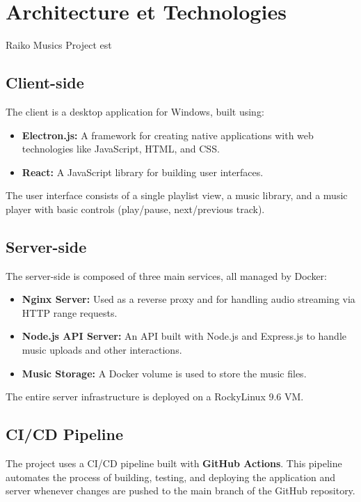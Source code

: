 \documentclass[12pt,a4paper]{article} %
\begin{document}
\section{Architecture et Technologies}

Raiko Musics Project est 

\subsection{Client-side}
The client is a desktop application for Windows, built using:
\begin{itemize}
    \item \textbf{Electron.js:} A framework for creating native applications with web technologies like JavaScript, HTML, and CSS.
    \item \textbf{React:} A JavaScript library for building user interfaces.
\end{itemize}

The user interface consists of a single playlist view, a music library, and a music player with basic controls (play/pause, next/previous track).

\subsection{Server-side}
The server-side is composed of three main services, all managed by Docker:
\begin{itemize}
    \item \textbf{Nginx Server:} Used as a reverse proxy and for handling audio streaming via HTTP range requests.
    \item \textbf{Node.js API Server:} An API built with Node.js and Express.js to handle music uploads and other interactions.
    \item \textbf{Music Storage:} A Docker volume is used to store the music files.
\end{itemize}
The entire server infrastructure is deployed on a RockyLinux 9.6 VM.

\subsection{CI/CD Pipeline}
The project uses a CI/CD pipeline built with \textbf{GitHub Actions}. This pipeline automates the process of building, testing, and deploying the application and server whenever changes are pushed to the main branch of the GitHub repository.
\end{document}
